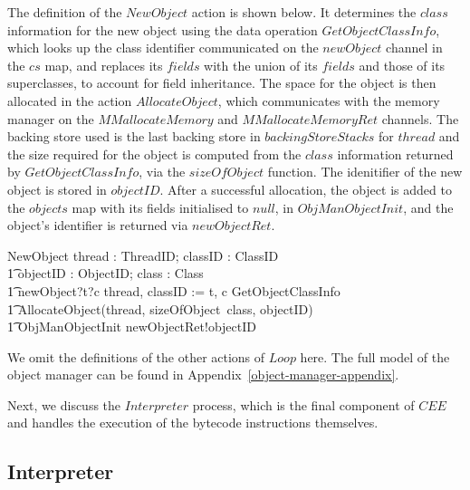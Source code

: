 The definition of the $NewObject$ action is shown below.
It determines the $class$ information for the new object using the
data operation $GetObjectClassInfo$, which looks up the class
identifier communicated on the $newObject$ channel in the $cs$ map,
and replaces its $fields$ with the union of its $fields$ and those of
its superclasses, to account for field inheritance.
The space for the object is then allocated in the action
$AllocateObject$, which communicates with the memory manager on the
$MMallocateMemory$ and $MMallocateMemoryRet$ channels.
The backing store used is the last backing store in
$backingStoreStacks$ for $thread$ and the size required for the object is
computed from the $class$ information returned by
$GetObjectClassInfo$, via the $sizeOfObject$ function.
The idenitifier of the new object is stored in $objectID$.
After a successful allocation, the object is added to the $objects$
map with its fields initialised to $null$, in $ObjManObjectInit$, and
the object's identifier is returned via $newObjectRet$.
\begin{circusaction}
  NewObject \circdef \circvar thread : ThreadID; classID : ClassID \circspot \\
  \t1 \circvar objectID : ObjectID; class : Class \circspot \\
  \t1 newObject?t?c \then thread, classID := t, c \circseq \lschexpract GetObjectClassInfo \rschexpract \circseq \\
  \t1 AllocateObject(thread, sizeOfObject~class, objectID) \circseq \\
  \t1 \lschexpract ObjManObjectInit \rschexpract \circseq newObjectRet!objectID \then \Skip
\end{circusaction}

We omit the definitions of the other actions of $Loop$ here. 
The full model of the object manager can be found in
Appendix~\ref{object-manager-appendix}.

Next, we discuss the $Interpreter$ process, which is the final
component of $CEE$ and handles the execution of the bytecode
instructions themselves.

\subsection{Interpreter}
\label{cee-interpreter-subsection}


